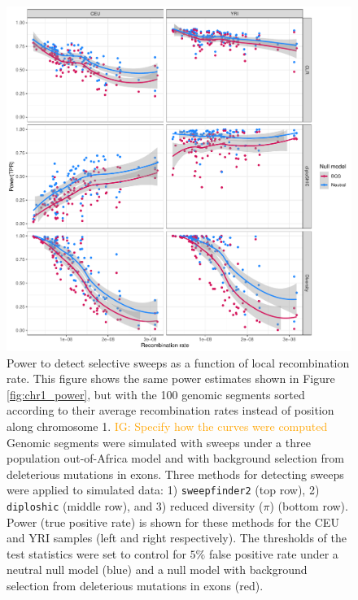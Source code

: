 \documentclass[hidelinks]{article}
\newcommand{\sweepfinder}{\texttt{sweepfinder2}\xspace}
\newcommand{\diploshic}{\texttt{diploshic}\xspace}
\newcommand{\igcomment}[1]{\textcolor{orange}{IG: #1}}
\begin{document}
    \begin{figure}[b!]
        \centering
        \includegraphics[width=0.8 \textwidth]{figures/sweeps/relationship_power_cM.pdf}
        \caption{
        Power to detect selective sweeps 
        as a function of local recombination rate.
        This figure shows the same power estimates shown in Figure \ref{fig:chr1_power},
        but with the 100 genomic segments sorted according to their
        average recombination rates instead of position along chromosome 1.
        \igcomment{Specify how the curves were computed}
	Genomic segments were simulated with sweeps under a three population out-of-Africa model
        \citep{gutenkunst2009inferring} and with background selection from deleterious mutations in exons.
        Three methods for detecting sweeps were applied to simulated data:
        1) \sweepfinder \citep{degiorgio2016sweepfinder2} (top row),
        2) \diploshic \citep{kern2018diplos} (middle row),
        and 3) reduced diversity ($\pi$) (bottom row).
        Power (true positive rate) is shown for these methods for the CEU and YRI
        samples (left and right respectively).
        The thresholds of the test statistics were set to control for
        $5\%$ false positive rate under a neutral null model (blue)
        and a null model with background selection from deleterious mutations in exons (red).
        }
        \label{fig:power-recomb}
    \end{figure}
\end{document}
